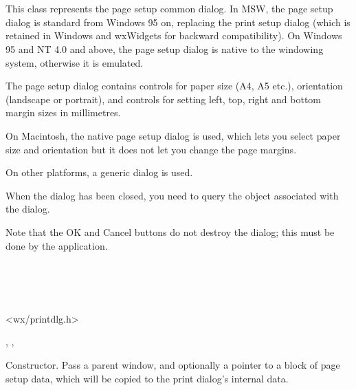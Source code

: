 \section{}\label{wxpagesetupdialog}

This class represents the page setup common dialog. In MSW, the page setup
dialog is standard from Windows 95 on, replacing the print setup dialog (which
is retained in Windows and wxWidgets for backward compatibility). On Windows 95
and NT 4.0 and above, the page setup dialog is native to the windowing system,
otherwise it is emulated.

The page setup dialog contains controls for paper size (A4, A5 etc.),
orientation (landscape or portrait), and controls for setting left, top, right
and bottom margin sizes in millimetres.

On Macintosh, the native page setup dialog is used, which lets you select paper
size and orientation but it does not let you change the page margins.

On other platforms, a generic dialog is used.

When the dialog has been closed, you need to query the
 object associated with
the dialog.

Note that the OK and Cancel buttons do not destroy the dialog; this must be done
by the application.


\\
\\
\\


<wx/printdlg.h>


, 
, 


\label{wxpagesetupdialogctor}


Constructor. Pass a parent window, and optionally a pointer to a block of page setup
data, which will be copied to the print dialog's internal data.

